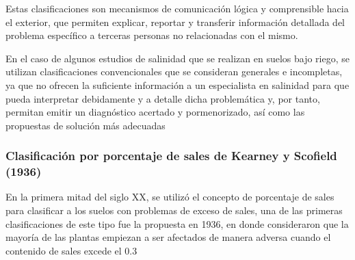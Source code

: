 Estas clasificaciones son mecanismos de comunicación lógica y comprensible hacia el exterior, que permiten explicar, reportar y transferir información detallada del problema específico a terceras personas no relacionadas con el mismo.

En el caso de algunos estudios de salinidad que se realizan en suelos bajo riego, se utilizan clasificaciones convencionales que se consideran generales e incompletas, ya que no ofrecen la suficiente información a un especialista en salinidad para que pueda interpretar debidamente y a detalle dicha problemática y, por tanto, permitan emitir un diagnóstico acertado y pormenorizado, así como las propuestas de solución más adecuadas

\subsubsection{Clasificación por porcentaje de sales de Kearney y Scofield (1936)}
En la primera mitad del siglo XX, se utilizó el concepto de porcentaje de sales para clasificar a los suelos con problemas de exceso de sales, una de las primeras clasificaciones de este tipo fue la propuesta en 1936, en donde consideraron que la mayoría de las plantas empiezan a ser afectados de manera adversa cuando el contenido de sales excede el 0.3%
